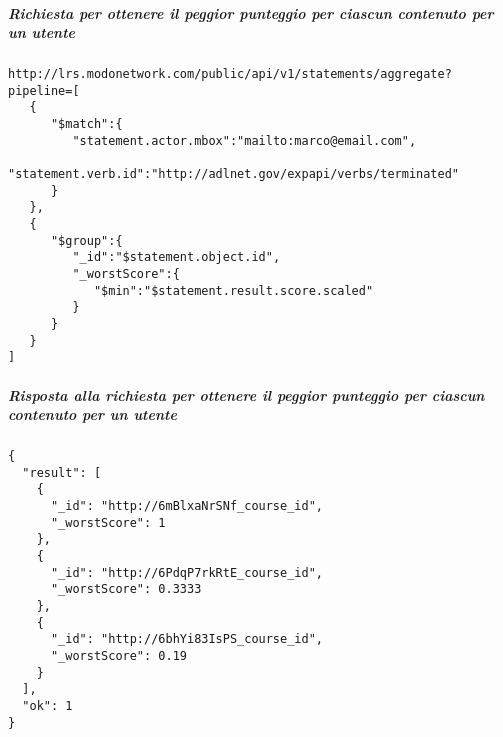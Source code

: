     \subparagraph*{Richiesta per ottenere il peggior punteggio per ciascun contenuto per un utente}\hfill \break
    \begin{lstlisting}
http://lrs.modonetwork.com/public/api/v1/statements/aggregate?pipeline=[
   {
      "$match":{
         "statement.actor.mbox":"mailto:marco@email.com",
         "statement.verb.id":"http://adlnet.gov/expapi/verbs/terminated"
      }
   },
   {
      "$group":{
         "_id":"$statement.object.id",
         "_worstScore":{
            "$min":"$statement.result.score.scaled"
         }
      }
   }
]
    \end{lstlisting}
    \subparagraph*{Risposta alla richiesta per ottenere il  peggior punteggio per ciascun contenuto per un utente}\hfill \break
    \begin{lstlisting}
{
  "result": [
    {
      "_id": "http://6mBlxaNrSNf_course_id",
      "_worstScore": 1
    },
    {
      "_id": "http://6PdqP7rkRtE_course_id",
      "_worstScore": 0.3333
    },
    {
      "_id": "http://6bhYi83IsPS_course_id",
      "_worstScore": 0.19
    }
  ],
  "ok": 1
}
    \end{lstlisting}